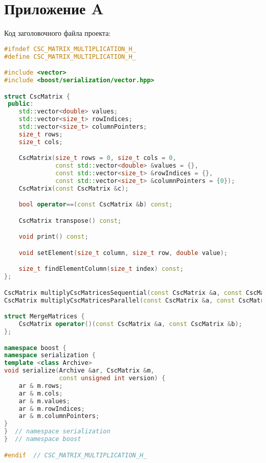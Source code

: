 \documentclass[a4paper,12pt]{article}
\begin{document}
\section*{Приложение A}
Код заголовочного файла проекта:
\begin{lstlisting}[language=C++]
#ifndef CSC_MATRIX_MULTIPLICATION_H_
#define CSC_MATRIX_MULTIPLICATION_H_

#include <vector>
#include <boost/serialization/vector.hpp>

struct CscMatrix {
 public:
    std::vector<double> values;
    std::vector<size_t> rowIndices;
    std::vector<size_t> columnPointers;
    size_t rows;
    size_t cols;

    CscMatrix(size_t rows = 0, size_t cols = 0,
              const std::vector<double> &values = {},
              const std::vector<size_t> &rowIndices = {},
              const std::vector<size_t> &columnPointers = {0});
    CscMatrix(const CscMatrix &c);

    bool operator==(const CscMatrix &b) const;

    CscMatrix transpose() const;

    void print() const;

    void setElement(size_t column, size_t row, double value);

    size_t findElementColumn(size_t index) const;
};

CscMatrix multiplyCscMatricesSequential(const CscMatrix &a, const CscMatrix &b);
CscMatrix multiplyCscMatricesParallel(const CscMatrix &a, const CscMatrix &b);

struct MergeMatrices {
    CscMatrix operator()(const CscMatrix &a, const CscMatrix &b);
};

namespace boost {
namespace serialization {
template <class Archive>
void serialize(Archive &ar, CscMatrix &m,
               const unsigned int version) {
    ar & m.rows;
    ar & m.cols;
    ar & m.values;
    ar & m.rowIndices;
    ar & m.columnPointers;
}
}  // namespace serialization
}  // namespace boost

#endif  // CSC_MATRIX_MULTIPLICATION_H_

\end{lstlisting}
\newpage
\end{document}

